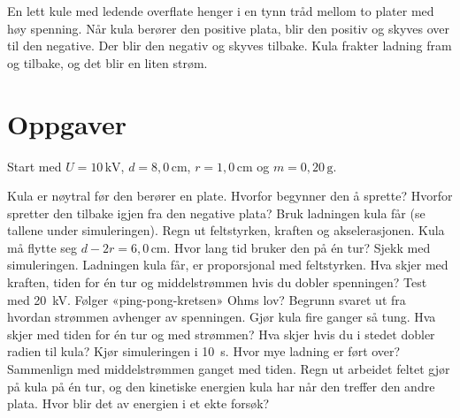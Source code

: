 \documentclass[11pt]{article}
\begin{document}

En lett kule med ledende overflate henger i en tynn tråd mellom to plater med høy spenning. Når kula berører den positive plata, blir den positiv og skyves over til den negative. Der blir den negativ og skyves tilbake. Kula frakter ladning fram og tilbake, og det blir en liten strøm.

\section*{Oppgaver}

Start med $U = 10\,\mathrm{kV}$, $d = 8{,}0\,\mathrm{cm}$, $r = 1{,}0\,\mathrm{cm}$ og $m = 0{,}20\,\mathrm{g}$.

\begin{oppgaveliste}
\oppgave {}Kula er nøytral før den berører en plate. Hvorfor begynner den å sprette? Hvorfor spretter den tilbake igjen fra den negative plata?
\svar
\oppgave {}Bruk ladningen kula får (se tallene under simuleringen). Regn ut feltstyrken, kraften og akselerasjonen. Kula må flytte seg $d - 2r = 6{,}0\,\mathrm{cm}$. Hvor lang tid bruker den på én tur? Sjekk med simuleringen.
\svar
\oppgave {}Ladningen kula får, er proporsjonal med feltstyrken. Hva skjer med kraften, tiden for én tur og middelstrømmen hvis du dobler spenningen? Test med 20~kV.
\svar
\oppgave {}Følger «ping-pong-kretsen» Ohms lov? Begrunn svaret ut fra hvordan strømmen avhenger av spenningen.
\svar
\oppgave {}Gjør kula fire ganger så tung. Hva skjer med tiden for én tur og med strømmen? Hva skjer hvis du i stedet dobler radien til kula?
\svar
\oppgave {}Kjør simuleringen i 10~s. Hvor mye ladning er ført over? Sammenlign med middelstrømmen ganget med tiden.
\svar
\oppgave {}Regn ut arbeidet feltet gjør på kula på én tur, og den kinetiske energien kula har når den treffer den andre plata. Hvor blir det av energien i et ekte forsøk?
\svar
\end{oppgaveliste}
\end{document}
